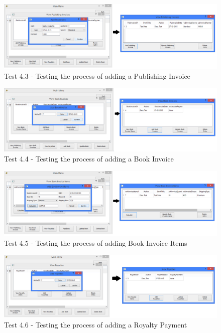 \begin{landscape}
\begin{figure}[H]
    \includegraphics[width=\textwidth]{./Testing/Evidence/Series4/AddPubInvoiceTest.png}
    \caption{Test 4.3 - Testing the process of adding a Publishing Invoice}  \label{fig:AddPubInvoiceTest}
\end{figure}

\begin{figure}[H]
    \includegraphics[width=\textwidth]{./Testing/Evidence/Series4/AddBookInvoiceTest.png}
    \caption{Test 4.4 - Testing the process of adding a Book Invoice}  \label{fig:AddBookInvoiceTest}
\end{figure}

\begin{figure}[H]
    \includegraphics[width=\textwidth]{./Testing/Evidence/Series4/AddBookInvoiceItemsTest.png}
    \caption{Test 4.5 - Testing the process of adding Book Invoice Items}  \label{fig:AddBookInvoiceItemsTest}
\end{figure}

\begin{figure}[H]
    \includegraphics[width=\textwidth]{./Testing/Evidence/Series4/AddRoyaltiesTest.png}
    \caption{Test 4.6 - Testing the process of adding a Royalty Payment}  \label{fig:AddRoyaltiesTest}
\end{figure}


\end{landscape}
